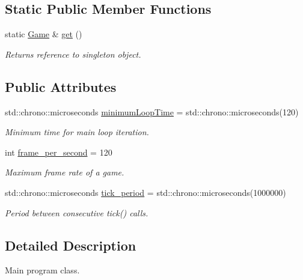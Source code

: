 \subsection*{Static Public Member Functions}
\begin{DoxyCompactItemize}
\item 
\hypertarget{classGame_ac69a0c5e25c7acb811f4a7b86a2ceb74}{static \hyperlink{classGame}{Game} \& \hyperlink{classGame_ac69a0c5e25c7acb811f4a7b86a2ceb74}{get} ()}\label{classGame_ac69a0c5e25c7acb811f4a7b86a2ceb74}

\begin{DoxyCompactList}\small\item\em Returns reference to singleton object. \end{DoxyCompactList}\end{DoxyCompactItemize}
\subsection*{Public Attributes}
\begin{DoxyCompactItemize}
\item 
std\-::chrono\-::microseconds \hyperlink{classGame_af9f24863bbe8102d1bf5d97aaa449d14}{minimum\-Loop\-Time} = std\-::chrono\-::microseconds(120)
\begin{DoxyCompactList}\small\item\em Minimum time for main loop iteration. \end{DoxyCompactList}\item 
int \hyperlink{classGame_ac57ebbcb3e9f6add9b4bf066c900c0db}{frame\-\_\-per\-\_\-second} = 120
\begin{DoxyCompactList}\small\item\em Maximum frame rate of a game. \end{DoxyCompactList}\item 
std\-::chrono\-::microseconds \hyperlink{classGame_a65800b8c8afee406d719b404a4a78877}{tick\-\_\-period} = std\-::chrono\-::microseconds(1000000)
\begin{DoxyCompactList}\small\item\em Period between consecutive tick() calls. \end{DoxyCompactList}\end{DoxyCompactItemize}


\subsection{Detailed Description}
Main program class. 

